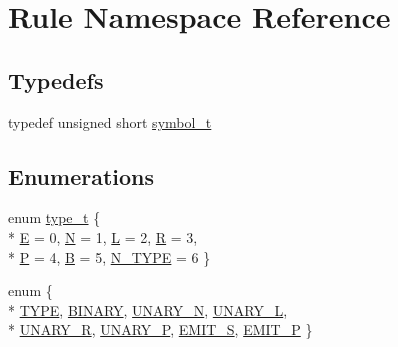 \hypertarget{namespace_rule}{\section{Rule Namespace Reference}
\label{namespace_rule}
}
\subsection*{Typedefs}
\begin{DoxyCompactItemize}
\item 
typedef unsigned short \hyperlink{namespace_rule_a99f842acb142ee96951f03ee29eccc9e}{symbol\+\_\+t}
\end{DoxyCompactItemize}
\subsection*{Enumerations}
\begin{DoxyCompactItemize}
\item 
enum \hyperlink{namespace_rule_a19cb2a2fcfb640a8dce289e3d476923d}{type\+\_\+t} \{ \\*
\hyperlink{namespace_rule_a19cb2a2fcfb640a8dce289e3d476923da8d6887bcfe26d3b4cbd9840e1a59911b}{E} = 0, 
\hyperlink{namespace_rule_a19cb2a2fcfb640a8dce289e3d476923da6dd06567d207537fb377b5741dc7beb2}{N} = 1, 
\hyperlink{namespace_rule_a19cb2a2fcfb640a8dce289e3d476923da27c476a31c516551979aace01707c645}{L} = 2, 
\hyperlink{namespace_rule_a19cb2a2fcfb640a8dce289e3d476923dac665245c7113dbae57446f61ae670305}{R} = 3, 
\\*
\hyperlink{namespace_rule_a19cb2a2fcfb640a8dce289e3d476923dace9e4e3c738fd69502554003314ffcb5}{P} = 4, 
\hyperlink{namespace_rule_a19cb2a2fcfb640a8dce289e3d476923da14966e5cbcab40679e26918350593ae2}{B} = 5, 
\hyperlink{namespace_rule_a19cb2a2fcfb640a8dce289e3d476923da67da480a37dad9f1e649f234911df149}{N\+\_\+\+T\+Y\+P\+E} = 6
 \}
\item 
enum \{ \\*
\hyperlink{namespace_rule_a058c708284da0910bec3ef4c84a7ffacad5214765384e8dd1d8cb86648afe4234}{T\+Y\+P\+E}, 
\hyperlink{namespace_rule_a058c708284da0910bec3ef4c84a7ffaca568a750e071bab13dd6545f5490db8b0}{B\+I\+N\+A\+R\+Y}, 
\hyperlink{namespace_rule_a058c708284da0910bec3ef4c84a7ffaca297280de0aa47c51f8983fcfea78f96e}{U\+N\+A\+R\+Y\+\_\+\+N}, 
\hyperlink{namespace_rule_a058c708284da0910bec3ef4c84a7ffacaafd399dcb880caedf24ed57977b60849}{U\+N\+A\+R\+Y\+\_\+\+L}, 
\\*
\hyperlink{namespace_rule_a058c708284da0910bec3ef4c84a7ffacaa956f832ee7584c1ac9eec5942fb0de0}{U\+N\+A\+R\+Y\+\_\+\+R}, 
\hyperlink{namespace_rule_a058c708284da0910bec3ef4c84a7ffaca023f5582b13cdcce4248a0297a17cddf}{U\+N\+A\+R\+Y\+\_\+\+P}, 
\hyperlink{namespace_rule_a058c708284da0910bec3ef4c84a7ffacad3c04caee437b0f327f539a59805eeff}{E\+M\+I\+T\+\_\+\+S}, 
\hyperlink{namespace_rule_a058c708284da0910bec3ef4c84a7ffacab4e9eee240ec06b5f2684df1a7390952}{E\+M\+I\+T\+\_\+\+P}
 \}
\end{DoxyCompactItemize}

